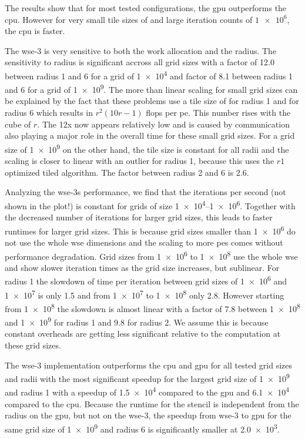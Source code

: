 The results show that for most tested configurations, the \ac{gpu} outperforms the \ac{cpu}.
However for very small tile sizes of  and large iteration counts of $\num{1e6}$, the \ac{cpu} is faster.

The \ac{wse}-3 is very sensitive to both the work allocation and the radius. The sensitivity to radius is significant accross all grid sizes with a factor of \num{12.0} between radius \num{1} and \num{6} for a grid of \num{1e4} and factor of \num{8.1} between radius \num{1} and \num{6} for a grid of \num{1e9}.
The more than linear scaling for small grid sizes can be explained by the fact that these problems use a tile size of  for radius \num{1} and  for radius \num{6} which results in $r^2(10r-1)$ flops per \ac{pe}. This number rises with the cube of $r$. The 12x now appears relatively low and is caused by communication also playing a major role in the overall time for these small grid sizes. For a grid size of \num{1e9} on the other hand, the tile size is constant for all radii and the scaling is closer to linear with an outlier for radius \num{1}, because this uses the $r1$ optimized tiled algorithm. The factor between radius \num{2} and \num{6} is \num{2.6}.

Analyzing the \ac{wse}-3s performance, we find that the iterations per second (not shown in the plot!) is constant for grids of size \numrange{1e4}{1e6}. Together with the decreased number of iterations for larger grid sizes, this leads to faster runtimes for larger grid sizes. This is because grid sizes smaller than \num{1e6} do not use the whole \ac{wse} dimensions and the scaling to more \acp{pe} comes without performance degradation. Grid sizes from \num{1e6} to \num{1e8} use the whole \ac{wse} and show slower iteration times as the grid size increases, but sublinear. For radius \num{1} the slowdown of time per iteration between grid sizes of \num{1e6} and \num{1e7} is only \num{1.5} and from \num{1e7} to \num{1e8} only \num{2.8}. However starting from \num{1e8} the slowdown is almost linear with a factor of \num{7.8} between \num{1e8} and \num{1e9} for radius \num{1} and \num{9.8} for radius \num{2}. We assume this is because constant overheads are getting less significant relative to the computation at these grid sizes.

The \ac{wse}-3 implementation outperforms the \ac{cpu} and \ac{gpu} for all tested grid sizes and radii with the most significant speedup for the largest grid size of \num{1e9} and radius \num{1} with a speedup of \num{1.5e4} compared to the \ac{gpu} and \num{6.1e4} compared to the \ac{cpu}. Because the runtime for the stencil is independent from the radius on the \ac{gpu}, but not on the \ac{wse}-3, the speedup from \ac{wse}-3 to \ac{gpu} for the same grid size of \num{1e9} and radius \num{6} is significantly smaller at \num{2.0e3}.


